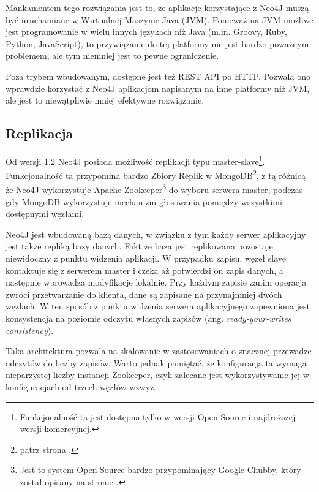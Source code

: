 Mankamentem tego rozwiązania jest to, że aplikacje korzystające z Neo4J muszą być uruchamiane w Wirtualnej Maszynie Java (JVM).
Ponieważ na JVM możliwe jest programowanie w wielu innych językach niż Java (m.in. Groovy, Ruby, Python, JavaScript), to przywiązanie do tej platformy nie jest bardzo poważnym problemem, ale tym niemniej jest to pewne ograniczenie.

Poza trybem wbudowanym, dostępne jest też REST API po HTTP.
Pozwala ono wprawdzie korzystać z Neo4J aplikacjom napisanym na inne platformy niż JVM, ale jest to niewątpliwie mniej efektywne rozwiązanie.

\subsection*{Replikacja}


Od wersji 1.2 Neo4J posiada możliwość replikacji typu master-slave\footnote{Funkcjonalność ta jest dostępna tylko w wersji Open Source i najdroższej wersji komercyjnej.}.
Funkcjonalność ta przypomina bardzo Zbiory Replik w MongoDB\footnote{patrz strona \pageref{sec:mongodb-replication}.}, z tą różnicą że Neo4J wykorzystuje Apache Zookeeper\footnote{Jest to system Open Source bardzo przypominający Google Chubby, który został opisany na stronie \pageref{sec:google-chubby}.} do wyboru serwera master, podczas gdy MongoDB wykorzystuje mechanizm głosowania pomiędzy wszystkimi dostępnymi węzłami.

Neo4J jest wbudowaną bazą danych, w związku z tym każdy serwer aplikacyjny jest także repliką bazy danych.
Fakt że baza jest replikowana pozostaje niewidoczny z punktu widzenia aplikacji.
W przypadku zapisu, węzeł slave kontaktuje się z serwerem master i czeka aż potwierdzi on zapis danych, a następnie wprowadza modyfikacje lokalnie.
Przy każdym zapisie zanim operacja zwróci przetwarzanie do klienta, dane są zapisane na przynajmniej dwóch węzłach.
W ten sposób z punktu widzenia serwera aplikacyjnego zapewniona jest konsystencja na poziomie odczytu własnych zapisów (ang. \emph{ready-your-writes consistency}).

Taka architektura pozwala na skalowanie w zastosowaniach o znacznej przewadze odczytów do liczby zapisów.
Warto jednak pamiętać, że konfiguracja ta wymaga nieparzystej liczby instancji Zookeeper, czyli zalecane jest wykorzystywanie jej w konfiguracjach od trzech węzłów wzwyż.

